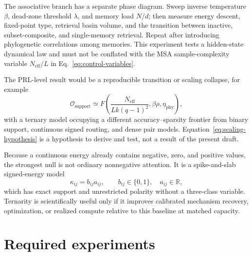 \documentclass[10pt,twocolumn]{article}
\newcommand{\R}{\mathbb R}
\newcommand{\1}{\mathbf 1}
\theoremstyle{remark}
\begin{document}
The associative branch has a separate phase diagram.  Sweep inverse temperature $\beta$, dead-zone
threshold $\lambda$, and memory load $N/d$; then measure energy descent, fixed-point type, retrieval
basin volume, and the transition between inactive, subset-composite, and single-memory retrieval.
Repeat after introducing phylogenetic correlations among memories.  This experiment tests a
hidden-state dynamical law and must not be conflated with the MSA sample-complexity variable
$N_{\mathrm{eff}}/L$ in Eq.~\ref{eq:control-variables}.

The PRL-level result would be a reproducible transition or scaling collapse, for example
\begin{equation}
\mathcal O_{\mathrm{support}}
\simeq
F\!\left(
\frac{N_{\mathrm{eff}}}{Lk(q-1)^2},
\beta\rho,
\eta_{\mathrm{phy}}
\right),
\label{eq:scaling-hypothesis}
\end{equation}
with a ternary model occupying a different accuracy--sparsity frontier from binary support,
continuous signed routing, and dense pair models.  Equation~\ref{eq:scaling-hypothesis} is a
hypothesis to derive and test, not a result of the present draft.

Because a continuous energy already contains negative, zero, and positive values, the strongest
null is not ordinary nonnegative attention.  It is a spike-and-slab signed-energy model
\begin{equation}
\kappa_{ij}=b_{ij}a_{ij},
\qquad b_{ij}\in\{0,1\},\quad a_{ij}\in\R,
\label{eq:binary-support-signed-energy}
\end{equation}
which has exact support and unrestricted polarity without a three-class variable.  Ternarity is
scientifically useful only if it improves calibrated mechanism recovery, optimization, or realized
compute relative to this baseline at matched capacity.

\section{Required experiments}
\end{document}
